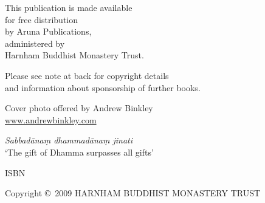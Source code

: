 \cleartoverso
\thispagestyle{empty}
{\copyrightsize\setlength{\parskip}{0.5\baselineskip}\setlength{\parindent}{0em}%
\raggedright%
\shaker\color[gray]{0.3}

This publication is made available\\
for free distribution\\
by Aruna Publications,\\
administered by\\
Harnham Buddhist Monastery Trust.

Please see note at back for copyright details\\
and information about sponsorship of further books.

Cover photo offered by Andrew Binkley\\
\href{http://andrewbinkley.com}{www.andrewbinkley.com}

\textit{Sabbadānaṃ dhammadānaṃ jinati}\\
`The gift of Dhamma surpasses all gifts'

ISBN \theISBN

Copyright \copyright\ 2009 HARNHAM BUDDHIST MONASTERY TRUST

}

